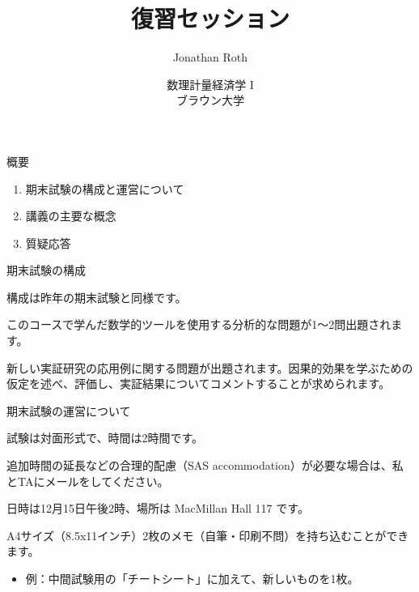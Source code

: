 \documentclass[11pt,handout]{beamer}
\newenvironment{wideitemize}{\itemize\addtolength{\itemsep}{10pt}}{\enditemize}
\begin{document}
	
	\begin{frame}[noframenumbering]{}
		\vspace{0.5cm}
		\title[]{復習セッション}
		\author{Jonathan Roth}
		\date{数理計量経済学 I \\ ブラウン大学\\} 
		\titlepage {\small{}\ }\thispagestyle{empty} \vspace{-30pt}
		
	\end{frame}


\begin{frame}{概要}
	\begin{enumerate}
		\item 
		期末試験の構成と運営について
		\vspace{0.5cm}
		\item
		講義の主要な概念
		\vspace{0.5cm}
		\item
		質疑応答
	\end{enumerate}
\end{frame}
	
	
\begin{frame}{期末試験の構成}
	\begin{wideitemize}
		\item
		構成は昨年の期末試験と同様です。
		
		\item
		このコースで学んだ数学的ツールを使用する分析的な問題が1〜2問出題されます。
		
		\item
		新しい実証研究の応用例に関する問題が出題されます。因果的効果を学ぶための仮定を述べ、評価し、実証結果についてコメントすることが求められます。
		
	\end{wideitemize}
\end{frame}	


\begin{frame}{期末試験の運営について}
	\begin{wideitemize}
		
		\item
		試験は対面形式で、時間は2時間です。
			\begin{wideitemize}
				\item
				追加時間の延長などの合理的配慮（SAS accommodation）が必要な場合は、私とTAにメールをしてください。
			\end{wideitemize}
		
		\item
		日時は12月15日午後2時、場所は MacMillan Hall 117 です。
		
		\item
		A4サイズ（8.5x11インチ）2枚のメモ（自筆・印刷不問）を持ち込むことができます。
			\begin{itemize}
				\item 
				例：中間試験用の「チートシート」に加えて、新しいものを1枚。
			\end{itemize}
		
	\end{wideitemize}
\end{frame}
\end{document}
